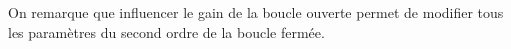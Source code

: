 On remarque que influencer le gain de la boucle ouverte permet de modifier
tous les paramètres du second ordre de la boucle fermée.









%


